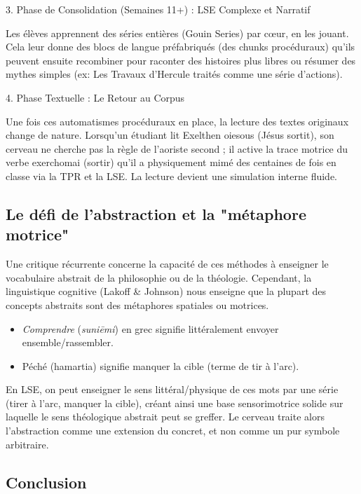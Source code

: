 3. Phase de Consolidation (Semaines 11+) : LSE Complexe et Narratif

Les élèves apprennent des séries entières (Gouin Series) par cœur, en les jouant. Cela leur donne
des \og blocs\fg{} de langue préfabriqués (des chunks procéduraux) qu'ils peuvent ensuite recombiner
pour raconter des histoires plus libres ou résumer des mythes simples (ex: Les Travaux d'Hercule
traités comme une série d'actions).

4. Phase Textuelle : Le Retour au Corpus

Une fois ces automatismes procéduraux en place, la lecture des textes originaux change de nature.
Lorsqu'un étudiant lit Exelthen oiesous (\og Jésus sortit\fg{}), son cerveau ne cherche pas la règle
de l'aoriste second ; il active la trace motrice du verbe exerchomai (sortir) qu'il a physiquement
mimé des centaines de fois en classe via la TPR et la LSE. La lecture devient une simulation interne
fluide.



\subsection{Le défi de l'abstraction et la "métaphore motrice"}

Une critique récurrente concerne la capacité de ces méthodes à enseigner le vocabulaire abstrait de
la philosophie ou de la théologie.\cite{III-2-2-ref29} Cependant, la linguistique cognitive (Lakoff
\& Johnson) nous enseigne que la plupart des concepts abstraits sont des métaphores spatiales ou
motrices.

\begin{itemize}\item \textit{Comprendre} (\textit{suniēmi}) en grec signifie littéralement \og envoyer ensemble/rassembler\fg{}.\item Péché (hamartia) signifie \og manquer la cible\fg{} (terme de tir à l'arc).\end{itemize}En LSE, on peut enseigner le sens littéral/physique de ces mots par une série (tirer à l'arc,
manquer la cible), créant ainsi une base sensorimotrice solide sur laquelle le sens théologique
abstrait peut se greffer. Le cerveau traite alors l'abstraction comme une extension du concret, et
non comme un pur symbole arbitraire.



\subsection{Conclusion}

